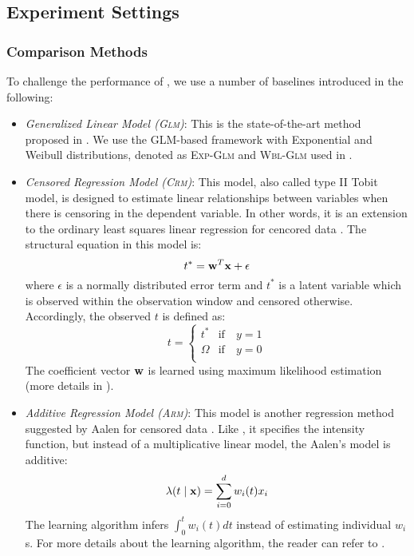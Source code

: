 \subsection{Experiment Settings}
\subsubsection{Comparison Methods}
To challenge the performance of \npglm, we use a number of baselines introduced in the following:

\begin{itemize}\color{red}
\item \emph{Generalized Linear Model (\textsc{Glm})}: This is the state-of-the-art method proposed in \cite{sun2012will}. We use the GLM-based framework with Exponential and Weibull distributions, denoted as \textsc{Exp-Glm} and \textsc{Wbl-Glm} used in \cite{sun2012will}.

\item \emph{Censored Regression Model (\textsc{Crm})}: This model, also called type II Tobit model, is designed to estimate linear relationships between variables when there is censoring in the dependent variable. In other words, it is an extension to the ordinary least squares linear regression for cencored data \cite{tobit}. The structural equation in this model is:
\[ t^*=\mathbf{w}^T\mathbf{x}+\epsilon \]
where $\epsilon$ is a normally distributed error term and $t^*$ is a latent variable which is observed within the observation window and censored otherwise. Accordingly, the observed $t$ is defined as:
\[ t=\begin{cases}
t^* & \text{if}\quad y=1 \\
\Omega & \text{if}\quad y=0\\
\end{cases} \]
The coefficient vector $\mathbf{w}$ is learned using maximum likelihood estimation (more details in \cite{amemiya1984tobit}).
\item \emph{Additive Regression Model (\textsc{Arm})}: This model is another regression method suggested by Aalen for censored data \cite{aalen1989linear}. Like \npglm, it specifies the intensity function, but instead of a multiplicative linear model, the Aalen's model is additive:
\[\lambda(t\mid \mathbf{x})=\sum_{i=0}^dw_i(t)x_i \]
The learning algorithm infers $\int_{0}^{t}w_i(t)dt$ instead of estimating individual $w_i$s. 
For more details about the learning algorithm, the reader can refer to \cite{hosmer2011applied}.

\end{itemize}

